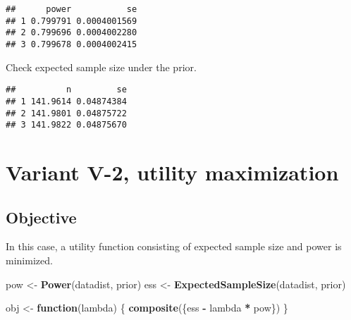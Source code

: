 \documentclass[]{book}
\newenvironment{Shaded}{\begin{snugshade}}{\end{snugshade}}
\newcommand{\ControlFlowTok}[1]{\textcolor[rgb]{0.13,0.29,0.53}{\textbf{#1}}}
\newcommand{\DataTypeTok}[1]{\textcolor[rgb]{0.13,0.29,0.53}{#1}}
\newcommand{\DecValTok}[1]{\textcolor[rgb]{0.00,0.00,0.81}{#1}}
\newcommand{\FloatTok}[1]{\textcolor[rgb]{0.00,0.00,0.81}{#1}}
\newcommand{\KeywordTok}[1]{\textcolor[rgb]{0.13,0.29,0.53}{\textbf{#1}}}
\newcommand{\NormalTok}[1]{#1}
\newcommand{\OperatorTok}[1]{\textcolor[rgb]{0.81,0.36,0.00}{\textbf{#1}}}
\newcommand{\StringTok}[1]{\textcolor[rgb]{0.31,0.60,0.02}{#1}}
\begin{document}
\begin{verbatim}
##      power           se
## 1 0.799791 0.0004001569
## 2 0.799696 0.0004002280
## 3 0.799678 0.0004002415
\end{verbatim}

Check expected sample size under the prior.

\begin{Shaded}
\end{Shaded}

\begin{verbatim}
##          n         se
## 1 141.9614 0.04874384
## 2 141.9801 0.04875722
## 3 141.9822 0.04875670
\end{verbatim}

\hypertarget{variantV_2}{%
\section{Variant V-2, utility maximization}\label{variantV_2}}

\hypertarget{objective-11}{%
\subsection{Objective}\label{objective-11}}

In this case, a utility function consisting of expected sample size and
power is minimized.

\begin{Shaded}
\begin{Highlighting}[]
\NormalTok{pow <-}\StringTok{ }\KeywordTok{Power}\NormalTok{(datadist, prior)}
\NormalTok{ess <-}\StringTok{ }\KeywordTok{ExpectedSampleSize}\NormalTok{(datadist, prior)}

\NormalTok{obj <-}\StringTok{ }\ControlFlowTok{function}\NormalTok{(lambda) \{}
  \KeywordTok{composite}\NormalTok{(\{ess }\OperatorTok{-}\StringTok{ }\NormalTok{lambda }\OperatorTok{*}\StringTok{ }\NormalTok{pow\})}
\NormalTok{\}}
\end{Highlighting}
\end{Shaded}
\end{document}
